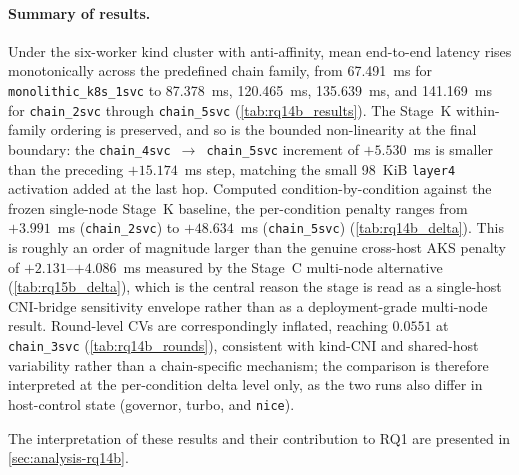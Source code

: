 \paragraph{Summary of results.}
Under the six-worker kind cluster with anti-affinity, mean end-to-end latency
rises monotonically across the predefined chain family, from 67.491~ms for
\texttt{monolithic\_k8s\_1svc} to 87.378~ms, 120.465~ms, 135.639~ms, and
141.169~ms for \texttt{chain\_2svc} through \texttt{chain\_5svc}
(\cref{tab:rq14b_results}). The Stage~K within-family ordering is preserved, and
so is the bounded non-linearity at the final boundary: the
\texttt{chain\_4svc}~$\rightarrow$~\texttt{chain\_5svc} increment of $+5.530$~ms
is smaller than the preceding $+15.174$~ms step, matching the small 98~KiB
\texttt{layer4} activation added at the last hop. Computed
condition-by-condition against the frozen single-node Stage~K baseline, the
per-condition penalty ranges from $+3.991$~ms (\texttt{chain\_2svc}) to
$+48.634$~ms (\texttt{chain\_5svc}) (\cref{tab:rq14b_delta}). This is roughly an
order of magnitude larger than the genuine cross-host AKS penalty of
$+2.131$--$+4.086$~ms measured by the Stage~C multi-node alternative
(\cref{tab:rq15b_delta}), which is the central reason the stage is read as a
single-host CNI-bridge sensitivity envelope rather than as a deployment-grade
multi-node result. Round-level CVs are correspondingly inflated, reaching
$0.0551$ at \texttt{chain\_3svc} (\cref{tab:rq14b_rounds}), consistent with
kind-CNI and shared-host variability rather than a chain-specific mechanism; the
comparison is therefore interpreted at the per-condition delta level only, as the
two runs also differ in host-control state (governor, turbo, and \texttt{nice}).

The interpretation of these results and their contribution to RQ1 are presented
in \cref{sec:analysis-rq14b}.
